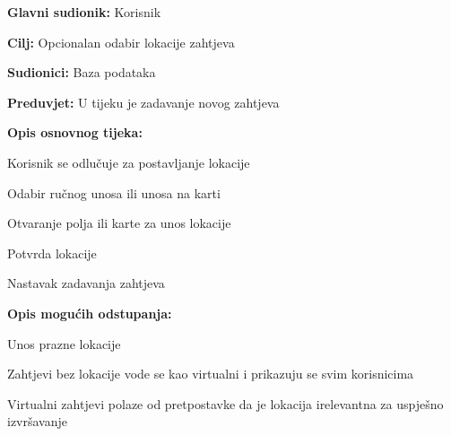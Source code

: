 					\noindent {}
					\begin{packed_item}
						
						\item \textbf{Glavni sudionik: }Korisnik
						\item  \textbf{Cilj:} Opcionalan odabir lokacije zahtjeva
						\item  \textbf{Sudionici:} Baza podataka
						\item  \textbf{Preduvjet:} U tijeku je zadavanje novog zahtjeva
						\item  \textbf{Opis osnovnog tijeka:}
						
						\item[] \begin{packed_enum}
							
							\item Korisnik se odlučuje za postavljanje lokacije
							\item Odabir ručnog unosa ili unosa na karti
							\item Otvaranje polja ili karte za unos lokacije
							\item Potvrda lokacije
							\item Nastavak zadavanja zahtjeva
						\end{packed_enum}
						
						\item  \textbf{Opis mogućih odstupanja:}
						
						\item[] \begin{packed_item}
							
							\item[3.a] Unos prazne lokacije
							\item[] \begin{packed_enum}
								
								\item Zahtjevi bez lokacije vode se kao virtualni i prikazuju se svim korisnicima
								\item Virtualni zahtjevi polaze od pretpostavke da je lokacija irelevantna za uspješno izvršavanje
								
							\end{packed_enum}							
						\end{packed_item}
					\end{packed_item}
				
